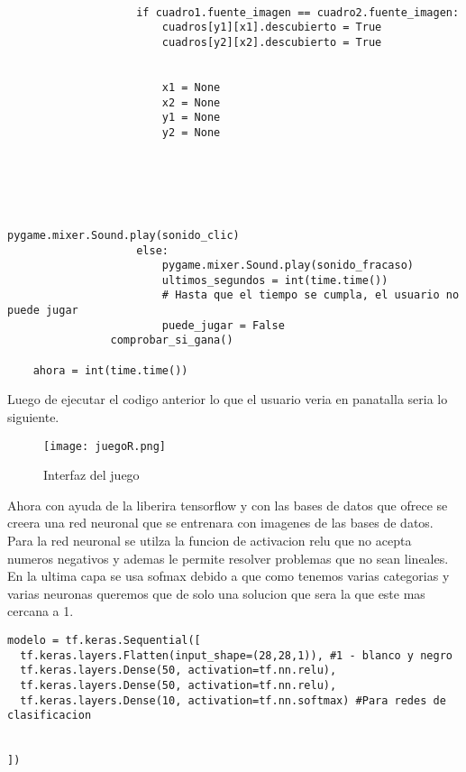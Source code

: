 \documentclass[10pt,twocolumn]{article}
\begin{document}
\begin{lstlisting}[frame=single]
                    
                    if cuadro1.fuente_imagen == cuadro2.fuente_imagen:
                        cuadros[y1][x1].descubierto = True
                        cuadros[y2][x2].descubierto = True
                        
                    
                        x1 = None
                        x2 = None
                        y1 = None
                        y2 = None
                        
                        
                        
                        
                        
    \end{lstlisting}
    
    
    \lstset{language=Python, breaklines=true, basicstyle=\footnotesize}
\begin{lstlisting}[frame=single]
                        pygame.mixer.Sound.play(sonido_clic)
                    else:
                        pygame.mixer.Sound.play(sonido_fracaso)
                        ultimos_segundos = int(time.time())
                        # Hasta que el tiempo se cumpla, el usuario no puede jugar
                        puede_jugar = False
                comprobar_si_gana()

    ahora = int(time.time())
\end{lstlisting}

Luego de ejecutar el codigo anterior lo que el usuario veria en panatalla seria lo siguiente.
\begin{figure}[ht]
  \centering
  \texttt{[image: juegoR.png]}
  \caption{Interfaz del juego}
\end{figure}

Ahora con ayuda de la liberira tensorflow y con las bases de datos que ofrece se creera una red neuronal que se entrenara con imagenes de las bases de datos. Para la red neuronal se utilza la funcion de activacion relu que no acepta numeros negativos y ademas le permite resolver problemas que no sean lineales.
En la ultima capa se usa sofmax debido a que como tenemos varias categorias y varias neuronas queremos que de solo una solucion que sera la que este mas cercana a 1.
\lstset{language=Python, breaklines=true, basicstyle=\footnotesize}
\begin{lstlisting}[frame=single]
modelo = tf.keras.Sequential([
  tf.keras.layers.Flatten(input_shape=(28,28,1)), #1 - blanco y negro
  tf.keras.layers.Dense(50, activation=tf.nn.relu),
  tf.keras.layers.Dense(50, activation=tf.nn.relu),
  tf.keras.layers.Dense(10, activation=tf.nn.softmax) #Para redes de clasificacion


])  


\end{lstlisting}
\end{document}
